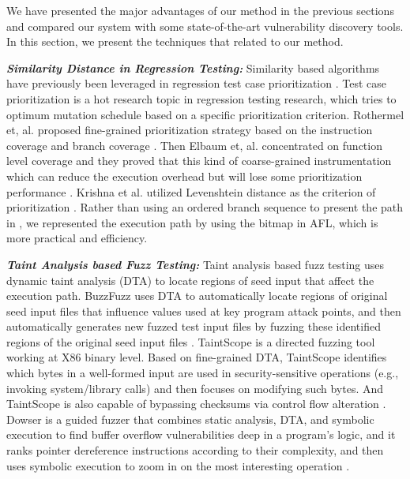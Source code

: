 We have presented the major advantages of our method in the previous sections and compared our system with some state-of-the-art vulnerability discovery tools. In this section, we present the techniques that related to our method.

\noindent\textit{\textbf{Similarity Distance in Regression Testing:}}
Similarity based algorithms have previously been leveraged in regression test case prioritization \cite{wang2015similarity, zhang2012simfuzz, jones2003test}. Test case prioritization is a hot research topic in regression testing research, which tries to optimum mutation schedule based on a specific prioritization criterion. Rothermel et, al. proposed fine-grained prioritization strategy based on the instruction coverage and branch coverage \cite{rothermel2001prioritizing}. Then Elbaum et, al. concentrated on function level coverage and they proved that this kind of coarse-grained instrumentation which can reduce the execution overhead but will lose some prioritization performance \cite{elbaum2001incorporating}. Krishna et al. utilized Levenshtein distance as the criterion of prioritization \cite{krishnamoorthi2009factor}. Rather than using an ordered branch sequence to present the path in \cite{wang2015similarity}, we represented the execution path by using the bitmap in AFL, which is more practical and efficiency.

\noindent\textit{\textbf{Taint Analysis based Fuzz Testing:}}
Taint analysis based fuzz testing uses dynamic taint analysis (DTA) to locate regions of seed input that affect the execution path. BuzzFuzz uses DTA to automatically locate regions of original seed input files that influence values used at key program attack points, and then automatically generates new fuzzed test input files by fuzzing these identified regions of the original seed input files \cite{ganesh2009taint}. TaintScope is a directed fuzzing tool working at X86 binary level. Based on fine-grained DTA, TaintScope identifies which bytes in a well-formed input are used in security-sensitive operations (e.g., invoking system/library calls) and then focuses on modifying such bytes. And TaintScope is also capable of bypassing checksums via control flow alteration \cite{wang2010taintscope}. Dowser is a guided fuzzer that combines static analysis, DTA, and symbolic execution to find buffer overflow vulnerabilities deep in a program’s logic, and it ranks pointer dereference instructions according to their complexity, and then uses symbolic execution to zoom in on the most interesting operation \cite{haller2013dowsing}.

